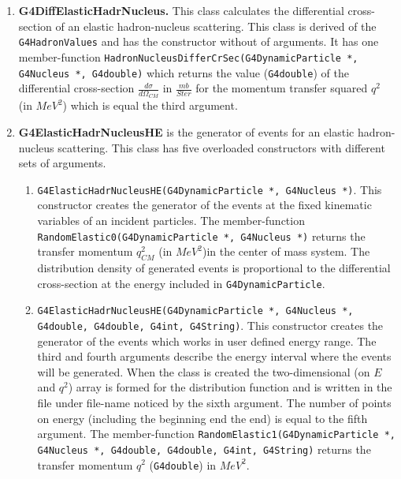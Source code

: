 \documentclass[12pt]{article}
\begin{document}
\begin{enumerate}
\begin{enumerate}
\end{enumerate}

\item  {\bf G4DiffElasticHadrNucleus.} This class  calculates the
differential cross-section of an elastic 
hadron-nucleus scattering. This class is derived of the 
{\tt G4HadronValues} and has the
constructor without of arguments. It has one member-function 
{\tt HadronNucleusDifferCrSec(G4Dyna\-micPar\-ti\-cle *, G4Nucleus *,
G4double)} 
which returns the value ({\tt G4double}) of the differential 
cross-section 
$\frac{\displaystyle d\sigma}{\displaystyle d\Omega_{CM}} $
in $ \frac{\displaystyle mb}{\displaystyle Ster}$
for the momentum transfer squared $q^2$ (in $MeV^2$) 
which is equal the third argument. 

\item {\bf G4ElasticHadrNucleusHE} is the generator of 
events for an elastic hadron-nucleus 
scattering. This class has five overloaded constructors 
with different sets of arguments.

\begin{enumerate}

\item {\tt G4ElasticHadrNucleusHE(G4DynamicParticle *, 
G4Nucleus *)}. 
This constructor creates the generator of the events 
at the fixed kinematic variables of an incident particles. 
 The member-function {\tt RandomElastic0(G4DynamicParticle *, 
G4Nucleus *)} returns the transfer momentum  $q_{CM}^2$
(in $MeV^2$)in the center of mass system. 
The distribution density of generated events 
is proportional to the differential 
cross-section at the energy included in {\tt G4DynamicParticle}.

\item {\tt G4ElasticHadrNucleusHE(G4DynamicParticle *, 
G4Nucleus *,
G4double, G4double, G4int, G4String)}. This constructor creates 
the generator of the events which works in user defined 
energy range. The third and fourth arguments 
describe the energy interval where the events will be generated. 
When the class is created the two-dimensional (on $E$ and $q^2$)
array is formed for the distribution function and is 
written in the file under file-name noticed by the sixth argument.  
The number of points on energy (including the beginning end the end) 
is equal to the fifth argument.
The member-function {\tt RandomElastic1(G4DynamicParticle *,
G4Nucleus *, G4double, G4double, G4int, G4String)} returns
the transfer momentum $q^2$ ({\tt G4double}) in $MeV^2$. 


\end{enumerate}
\end{enumerate}
\end{document}
